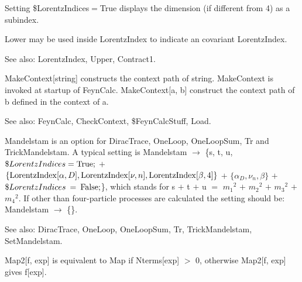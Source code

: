 \dispSFoutmath{
{{\alpha }^*}
}

Setting \${}LorentzIndices\(=\)True displays the dimension (if different from 4) as a subindex.


\dispSFinmath{
\mu 
}


\dispSFinmath{
{{\beta }^*}
}



Lower may be used inside LorentzIndex to indicate an covariant LorentzIndex.

See also:  LorentzIndex, Upper, Contract1.



MakeContext[string] constructs the context path of string. MakeContext is invoked at startup of FeynCalc. MakeContext[a, b] construct the
  context path of b defined in the context of a.

See also:  FeynCalc, CheckContext, \${}FeynCalcStuff, Load.



Mandelstam is an option for DiracTrace, OneLoop, OneLoopSum, Tr and TrickMandelstam. { }A typical setting is Mandelstam \(\rightarrow \)
  \{s, t, u, \(\$LorentzIndices=\mathrm{True};\) \(+\) \(\{\mathrm{LorentzIndex}[\alpha ,D],\mathrm{LorentzIndex}[\nu ,n],\mathrm{LorentzIndex}[\beta
,4]\}\) \(+\) \(\{{{\alpha }_D},{{\nu }_n},\beta \}\) \(+\) \(\$LorentzIndices\> =\> \mathrm{False};\)\}, which stands for { }s \(+\)
t \(+\) u \(=\) \({{{m_1}}^2}\) \(+\) \({{{m_2}}^2}\) \(+\) \({{{m_3}}^2}\) \(+\) \({{{m_4}}^2}\). If other than four-particle processes are calculated
the setting should be: Mandelstam \(\rightarrow \) \{\}.

See also:  DiracTrace, OneLoop, OneLoopSum, Tr, TrickMandelstam, SetMandelstam.



Map2[f, exp] is equivalent to Map if Nterms[exp] \(>\) 0, otherwise Map2[f, exp] gives f[exp].

